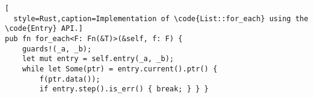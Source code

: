 \begin{lstlisting}[
  style=Rust,caption=Implementation of \code{List::for_each} using the \code{Entry} API.]
pub fn for_each<F: Fn(&T)>(&self, f: F) {
    guards!(_a, _b);
    let mut entry = self.entry(_a, _b);
    while let Some(ptr) = entry.current().ptr() {
        f(ptr.data());
        if entry.step().is_err() { break; } } }
\end{lstlisting}
